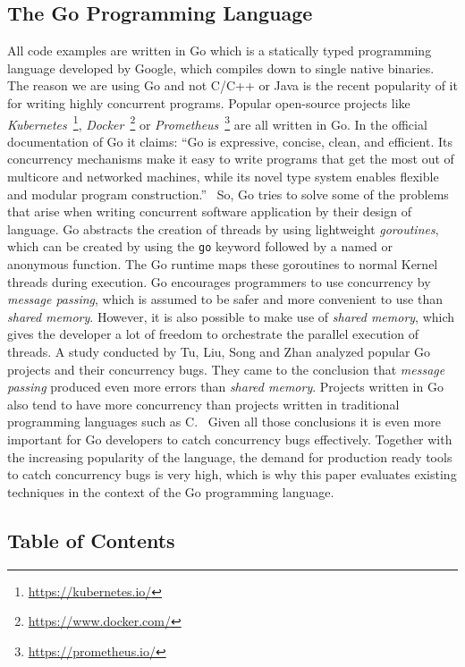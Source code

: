 \documentclass[conference]{IEEEtran}
\begin{document}
\subsection{The Go Programming Language}
All code examples are written in Go which is a statically typed programming language developed by Google, which compiles down to single native binaries.
The reason we are using Go and not C/C++ or Java is the recent popularity of it for writing highly concurrent programs.
Popular open-source projects like \emph{Kubernetes}~\footnote{\url{https://kubernetes.io/}}, \emph{Docker}~\footnote{\url{https://www.docker.com/}} or \emph{Prometheus}~\footnote{\url{https://prometheus.io/}} are all written in Go.
In the official documentation of Go it claims: ``Go is expressive, concise, clean, and efficient. Its concurrency mechanisms make it easy to write programs that get the most out of multicore and networked machines, while its novel type system enables flexible and modular program construction.''~\cite{goDocs}
So, Go tries to solve some of the problems that arise when writing concurrent software application by their design of language.
Go abstracts the creation of threads by using lightweight \emph{goroutines}, which can be created by using the \lstinline{go} keyword followed by a named or anonymous function.
The Go runtime maps these goroutines to normal Kernel threads during execution.
Go encourages programmers to use concurrency by \emph{message passing}, which is assumed to be safer and more convenient to use than \emph{shared memory}.
However, it is also possible to make use of \emph{shared memory}, which gives the developer a lot of freedom to orchestrate the parallel execution of threads.
A study conducted by Tu, Liu, Song and Zhan analyzed popular Go projects and their concurrency bugs.
They came to the conclusion that \emph{message passing} produced even more errors than \emph{shared memory}.
Projects written in Go also tend to have more concurrency than projects written in traditional programming languages such as C.~\cite{tu2019go}
Given all those conclusions it is even more important for Go developers to catch concurrency bugs effectively.
Together with the increasing popularity of the language, the demand for production ready tools to catch concurrency bugs is very high, which is why this paper evaluates existing techniques in the context of the Go programming language.

\subsection{Table of Contents}
\end{document}
